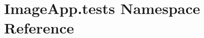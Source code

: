 \hypertarget{namespace_image_app_1_1tests}{}\section{Image\+App.\+tests Namespace Reference}
\label{namespace_image_app_1_1tests}
